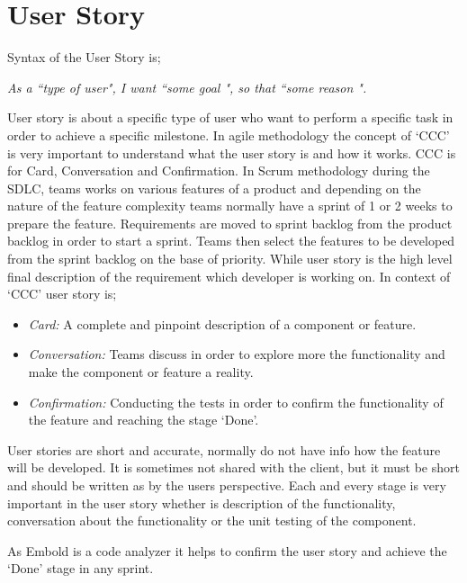 \section{User Story}
Syntax of the User Story is; \par
\emph{As a ``type of user", I want  ``some goal ", so that ``some reason ".} ~\cite{story}\par
User story is about a specific type of user who want to perform a specific task in order to achieve a specific milestone. In agile methodology the concept of `CCC' is very important to understand what the user story is and how it works. CCC is for Card, Conversation and Confirmation. In Scrum methodology during the SDLC, teams works on various features of a product and depending on the nature of the feature complexity teams normally have a sprint of 1 or 2 weeks to prepare the feature. Requirements are moved to sprint backlog from the product backlog in order to start a sprint. Teams then select the features to be developed from the sprint backlog on the base of priority. While user story is the high level final description of the requirement which  developer is working on. In context of `CCC' user story is;
\begin{itemize}
\item\emph{Card:} A complete and pinpoint description of a component or feature. 
\item\emph{Conversation:} Teams discuss in order to explore more the functionality and make the component or feature a reality.
\item\emph{Confirmation:} Conducting the tests in order to confirm the functionality of the feature and reaching the stage `Done'.
\end{itemize}\par
User stories are short and accurate, normally do not have info how the feature will be developed. It is sometimes not shared with the client, but it must be short and should be written as by the users perspective. Each and every stage is very important in the user story whether is description of the functionality, conversation about the functionality or the unit testing of the component. ~\cite{Agile}\par
As Embold is a code analyzer it helps to confirm the user story and achieve the `Done' stage in any sprint.

